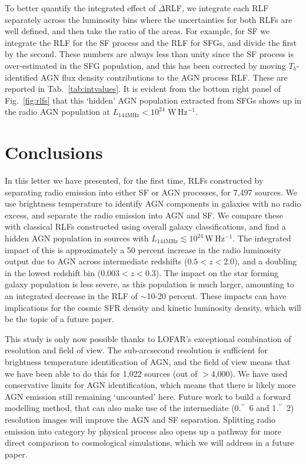 \documentclass[usenatbib,fleqn,letters]{mnras}
\newcommand{\sarc}{$^{\prime\prime}\!\!$}
\newcommand{\wphz}{$\,$W$\,$Hz$^{-1}$}
\newcommand{\llof}{$L_{\textrm{144MHz}}$}
\begin{document}
To better quantify the integrated effect of $\Delta$RLF, we integrate each RLF separately across the luminosity bins where the uncertainties for both RLFs are well defined, and then take the ratio of the areas. For example, for SF we integrate the RLF for the SF process and the RLF for SFGs, and divide the first by the second. These numbers are always less than unity since the SF process is over-estimated in the SFG population, and this has been corrected by moving $T_b$-identified AGN flux density contributions to the AGN process RLF. These are reported in Tab.~\ref{tab:intvalues}. 
It is evident from the bottom right panel of Fig.~\ref{fig:rlfs} that this `hidden' AGN population extracted from SFGs shows up in the radio AGN population at $L_{\textrm{144MHz}} < 10^{24}\,$\wphz .


\section{Conclusions}
\label{sec:conclusions}

In this letter we have presented, for the first time, RLFs constructed by separating radio emission into either SF or AGN processes, for 7,497 sources. We use brightness temperature to identify AGN components in galaxies with no radio excess, and separate the radio emission into AGN and SF. We compare these with classical RLFs constructed using overall galaxy classifications, and find a hidden AGN population in sources with \llof $\lesssim 10^{24}$\wphz . The integrated impact of this is approximately a 50 percent increase in the radio luminosity output due to AGN across intermediate redshifts ($0.5 < z < 2.0$), and a doubling in the lowest redshift bin ($0.003 < z < 0.3$). The impact on the star forming galaxy population is less severe, as this population is much larger, amounting to an integrated decrease in the RLF of $\sim$10-20 percent. These impacts can have implications for the cosmic SFR density and kinetic luminosity density, which will be the topic of a future paper. 

This study is only now possible thanks to LOFAR's exceptional combination of resolution and field of view. The sub-arcsecond resolution is sufficient for brightness temperature identification of AGN, and the field of view means that we have been able to do this for 1,022 sources (out of $>$4,000). We have used conservative limits for AGN identification, which means that there is likely more AGN emission still remaining `uncounted' here. Future work to build a forward modelling method, that can also make use of the intermediate (0.\sarc\ 6 and 1.\sarc\ 2) resolution images will improve the AGN and SF separation. Splitting radio emission into category by physical process also opens up a pathway for more direct comparison to cosmological simulations, which we will address in a future paper.
\end{document}
